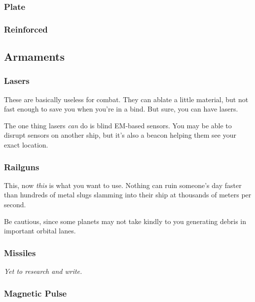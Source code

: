 \subsubsection{Plate}

\subsubsection{Reinforced}

\subsection{Armaments}

\subsubsection{Lasers}
\par
These are basically useless for combat. They can ablate a little material, but not fast enough to save you when you're in a bind. But sure, you can have lasers.

\par
The one thing lasers \textit{can} do is blind EM-based sensors. You may be able to disrupt sensors on another ship, but it's also a beacon helping them see your exact location.


\subsubsection{Railguns}
\par
This, now \textit{this} is what you want to use. Nothing can ruin someone's day faster than hundreds of metal slugs slamming into their ship at thousands of meters per second.

\par
Be cautious, since some planets may not take kindly to you generating debris in important orbital lanes.


\subsubsection{Missiles}

\textit{Yet to research and write.}

\subsubsection{Magnetic Pulse}

